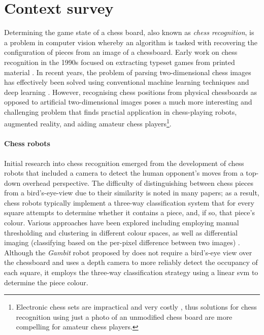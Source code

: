 \section{Context survey}


Determining the game state of a chess board, also known as \emph{chess recognition}, is a problem in computer vision whereby an algorithm is tasked with recovering the configuration of pieces from an image of a chessboard.
Early work on chess recognition in the 1990s focused on extracting typeset games from printed material \cite{baird1990}. 
In recent years, the problem of parsing two-dimensional chess images has effectively been solved using conventional machine learning techniques \cite{khater2012} and deep learning \cite{sameer2020,roy2020}.
However, recognising chess positions from physical chessboards as opposed to artificial two-dimensional images poses a much more interesting and challenging problem that finds practial application in chess-playing robots, augmented reality, and aiding amateur chess players\footnote{Electronic chess sets are impractical and very costly \cite{wang2013}, thus solutions for chess recognition using just a photo of an unmodified chess board are more compelling for amateur chess players.}.

\paragraph{Chess robots}
Initial research into chess recognition emerged from the development of chess robots that included a camera to detect the human opponent's moves from a top-down overhead perspective. 
The difficulty of distinguishing between chess pieces from a bird's-eye-view due to their similarity is noted in many papers; as a result, chess robots typically implement a three-way classification system that for every square attempts to determine whether it contains a piece, and, if so, that piece's colour.
Various approaches have been explored including
  employing manual thresholding \cite{cour2002,urting2003,banerjee2012,chen2016} and clustering \cite{goncalves2005} in different colour spaces, as well as
  differential imaging (classifying based on the per-pixel difference between two images) \cite{khan2014,chen2019}.
Although the \emph{Gambit} robot proposed by \textcite{matuszek2011} does not require a bird's-eye view over the chessboard and uses a depth camera to more reliably detect the occupancy of each square, it employs the three-way classification strategy using a linear \gls{svm} to determine the piece colour. 

